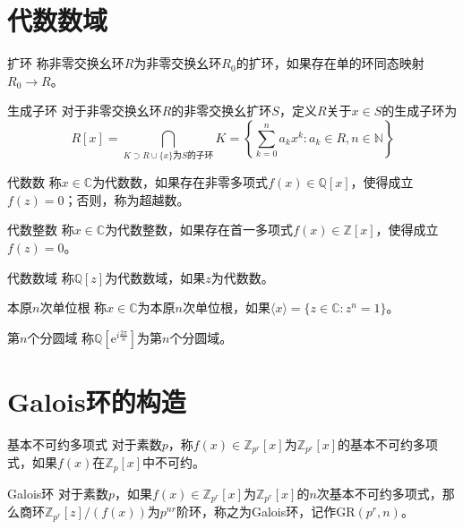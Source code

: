 \documentclass[lang = cn, scheme = chinese, thmcnt = section]{elegantbook}
\newcommand{\Q}{\mathbb{Q}}            %
\newcommand{\rang}{\rangle}            %
\begin{document}
\section{代数数域}

\begin{definition}{扩环}
	称非零交换幺环$R$为非零交换幺环$R_0$的扩环，如果存在单的环同态映射$R_0\to R$。
\end{definition}

\begin{definition}{生成子环}
	对于非零交换幺环$R$的非零交换幺扩环$S$，定义$R$关于$x\in S$的生成子环为
	$$
	R[x]=\bigcap_{K\supset R\cup\{x\}为S的子环}K=\left\{ \sum_{k=0}^{n}a_kx^k:a_k\in R,n\in\mathbb{N} \right\}
	$$
\end{definition}

\begin{definition}{代数数}
	称$x\in\mathbb{C}$为代数数，如果存在非零多项式$f(x)\in\Q[x]$，使得成立$f(z)=0$；否则，称为超越数。
\end{definition}

\begin{definition}{代数整数}
	称$x\in \mathbb{C}$为代数整数，如果存在首一多项式$f(x)\in\mathbb{Z}[x]$，使得成立$f(z)=0$。
\end{definition}

\begin{definition}{代数数域}
	称$\Q[z]$为代数数域，如果$z$为代数数。
\end{definition}

\begin{definition}{本原$n$次单位根}
	称$x\in\mathbb{C}$为本原$n$次单位根，如果$\langle x \rang = \{ z\in\mathbb{C}:z^n=1 \}$。
\end{definition}

\begin{definition}{第$n$个分圆域}
	称$\Q[\mathrm{e}^{i\frac{2\pi}{n}}]$为第$n$个分圆域。
\end{definition}

\section{Galois环的构造}

\begin{definition}{基本不可约多项式}
	对于素数$p$，称$f(x)\in \mathbb{Z}_{p^r}[x]$为$\mathbb{Z}_{p^r}[x]$的基本不可约多项式，如果$f(x)$在$\mathbb{Z}_p[x]$中不可约。
\end{definition}

\begin{definition}{Galois环}
	对于素数$p$，如果$f(x)\in \mathbb{Z}_{p^r}[x]$为$\mathbb{Z}_{p^r}[x]$的$n$次基本不可约多项式，那么商环$\mathbb{Z}_{p^r}[z]/(f(x))$为$p^{nr}$阶环，称之为Galois环，记作$\text{GR}(p^r,n)$。
\end{definition}
\end{document}
